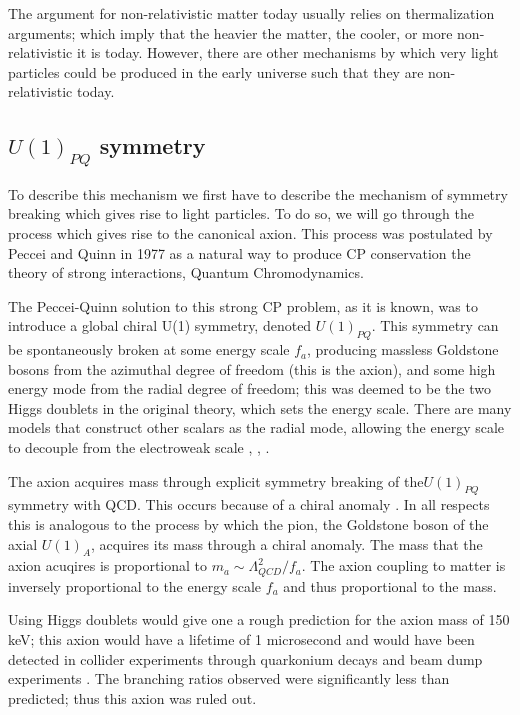 \documentclass[12pt, twosides]{book}
\begin{document}
The argument for non-relativistic matter today usually relies on thermalization arguments; which imply that the heavier the matter, the cooler, or more non-relativistic it is today. However, there are other mechanisms by which very light particles could be produced in the early universe such that they are non-relativistic today.

\subsection{$U(1)_{PQ}$ symmetry}

To describe this mechanism we first have to describe the mechanism of symmetry breaking which gives rise to light particles. To do so, we will go through the process which gives rise to the canonical axion. This process was postulated by Peccei and Quinn in 1977 \cite{peccei77} as a natural way to produce CP conservation the theory of strong interactions, Quantum Chromodynamics. 

The Peccei-Quinn solution to this strong CP problem, as it is known, was to introduce a global chiral U(1) symmetry, denoted $U(1)_{PQ}$. This symmetry can be spontaneously broken at some energy scale $f_a$, producing massless Goldstone bosons from the azimuthal degree of freedom (this is the axion), and some high energy mode from the radial degree of freedom; this was deemed to be the two Higgs doublets in the original theory, which sets the energy scale.  There are many models that construct other scalars as the radial mode, allowing the energy scale to decouple from the electroweak scale \cite{kim79} \cite{shifman80}, \cite{dine81}, \cite{zhitnitsky80}.

The axion acquires mass through explicit symmetry breaking of the$U(1)_{PQ}$ symmetry with QCD. This occurs because of a chiral anomaly \cite{jackiw76}. In all respects this is analogous to the process by which the pion, the Goldstone boson of the axial $U(1)_A$, acquires its mass through a chiral anomaly. The mass that the axion acuqires is proportional to $m_a \sim \Lambda_{QCD}^2/f_a$. The axion coupling to matter is inversely proportional to the energy scale $f_a$ and thus proportional to the mass.

Using Higgs doublets would give one a rough prediction for the axion mass of 150 keV; this axion would have a lifetime of 1 microsecond and would have been detected in collider experiments through quarkonium decays and beam dump experiments \cite{crystalball90}. The branching ratios observed were significantly less than predicted; thus this axion was ruled out.
\end{document}
